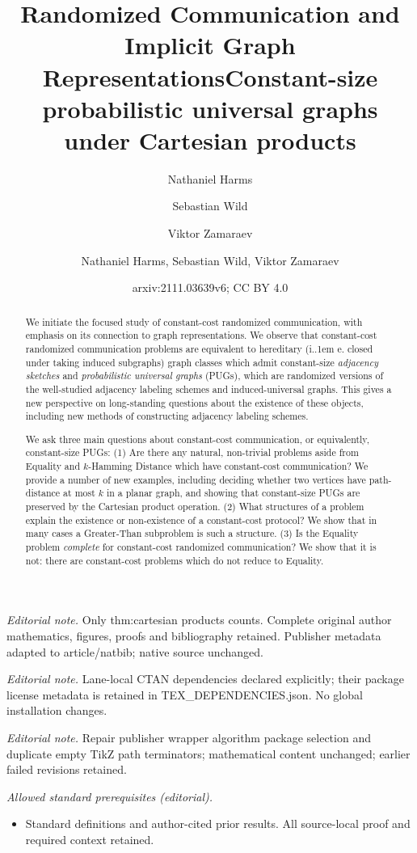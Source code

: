 \documentclass{article}
\title{Randomized Communication and Implicit Graph Representations}
\author{Nathaniel Harms \and Sebastian Wild \and Viktor Zamaraev}\date{}
\title{Constant-size probabilistic universal graphs under Cartesian products}
\author{Nathaniel Harms, Sebastian Wild, Viktor Zamaraev}
\date{arxiv:2111.03639v6; CC BY 4.0}
\makeatletter
\newcommand*\ie{i.\kern.1em e.\@\xspace} %
\makeatother
\begin{document}
\maketitle
\noindent\textit{Editorial note.} Only thm:cartesian products counts. Complete original author mathematics, figures, proofs and bibliography retained. Publisher metadata adapted to article/natbib; native source unchanged.\par\medskip
\noindent\textit{Editorial note.} Lane-local CTAN dependencies declared explicitly; their package license metadata is retained in TEX\_DEPENDENCIES.json. No global installation changes.\par\medskip
\noindent\textit{Editorial note.} Repair publisher wrapper algorithm package selection and duplicate empty TikZ path terminators; mathematical content unchanged; earlier failed revisions retained.\par\medskip
\noindent\textit{Allowed standard prerequisites (editorial).}\begin{itemize}
\item Standard definitions and author-cited prior results. All source-local proof and required context retained.
\end{itemize}\medskip

\maketitle

\begin{abstract}
We initiate the focused study of constant-cost randomized communication, with emphasis on its
connection to graph representations. We observe that constant-cost randomized communication
problems are equivalent to hereditary (\ie closed under taking induced subgraphs) graph classes
which admit constant-size \emph{adjacency sketches} and \emph{probabilistic universal graphs}
(PUGs), which are randomized versions of the well-studied adjacency labeling schemes and
induced-universal graphs.  This gives a new perspective on long-standing questions about the
existence of these objects, including new methods of constructing adjacency labeling schemes.

We ask three main questions about constant-cost communication, or equivalently, constant-size
PUGs: (1) Are there any natural, non-trivial problems aside from Equality
and $k$-Hamming Distance which have constant-cost communication? We provide a number of new
examples, including deciding whether two vertices have path-distance at most $k$ in a planar graph,
and showing that constant-size PUGs are preserved by the Cartesian product operation.  (2) What
structures of a problem explain the existence or non-existence of a constant-cost protocol?  
We show that in many cases a Greater-Than subproblem is such a structure.
(3) Is the Equality problem \emph{complete} for constant-cost randomized communication? We
show that it is not: there are constant-cost problems which do not reduce to Equality.
\end{abstract}
\end{document}
